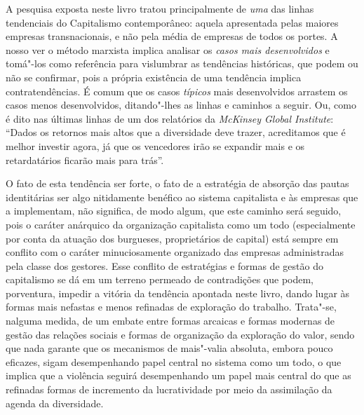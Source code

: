 A pesquisa exposta neste livro tratou principalmente de \emph{uma} das
linhas tendenciais do Capitalismo contemporâneo: aquela apresentada
pelas maiores empresas transnacionais, e não pela média de empresas de
todos os portes. A nosso ver o método marxista implica analisar os
\emph{casos mais desenvolvidos} e tomá"-los como referência para
vislumbrar as tendências históricas, que podem ou não se confirmar, pois
a própria existência de uma tendência implica contratendências. É comum
que os casos \emph{típicos} mais desenvolvidos arrastem os casos menos
desenvolvidos, ditando"-lhes as linhas e caminhos a seguir. Ou, como é
dito nas últimas linhas de um dos relatórios da \emph{McKinsey Global
Institute}: ``Dados os retornos mais altos que a diversidade deve
trazer, acreditamos que é melhor investir agora, já que os vencedores
irão se expandir mais e os retardatários ficarão mais para trás''.

O fato de esta tendência ser forte, o fato de a estratégia de absorção
das pautas identitárias ser algo nitidamente benéfico ao sistema
capitalista e às empresas que a implementam, não significa, de modo
algum, que este caminho será seguido, pois o caráter anárquico da
organização capitalista como um todo (especialmente por conta da atuação
dos burgueses, proprietários de capital) está sempre em conflito com o
caráter minuciosamente organizado das empresas administradas pela classe
dos gestores. Esse conflito de estratégias e formas de gestão do
capitalismo se dá em um terreno permeado de contradições que podem,
porventura, impedir a vitória da tendência apontada neste livro, dando
lugar às formas mais nefastas e menos refinadas de exploração do
trabalho. Trata"-se, nalguma medida, de um embate entre formas arcaicas e
formas modernas de gestão das relações sociais e formas de organização
da exploração do valor, sendo que nada garante que os mecanismos de
mais"-valia absoluta, embora pouco eficazes, sigam desempenhando papel
central no sistema como um todo, o que implica que a violência seguirá
desempenhando um papel mais central do que as refinadas formas de
incremento da lucratividade por meio da assimilação da agenda da
diversidade.

